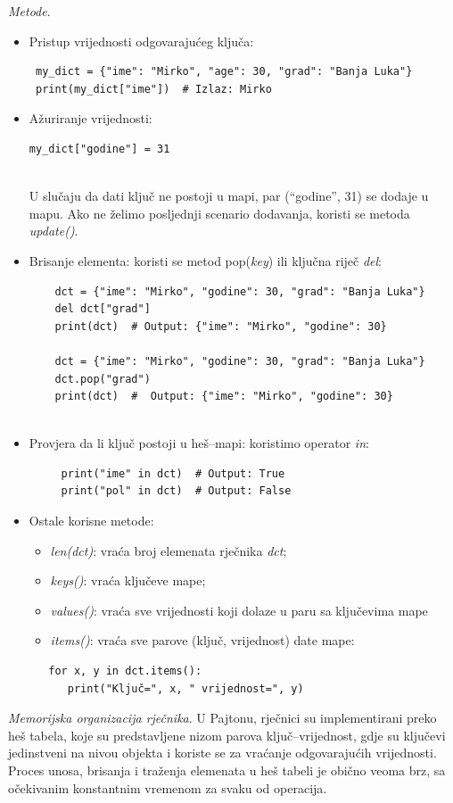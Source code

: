 \textit{Metode}. 
\begin{itemize}
	\item   Pristup vrijednosti odgovarajućeg ključa:
	
	\begin{verbatim}
 my_dict = {"ime": "Mirko", "age": 30, "grad": "Banja Luka"}
 print(my_dict["ime"])  # Izlaz: Mirko
	\end{verbatim}
	
     \item Ažuriranje vrijednosti:
     	
     \begin{verbatim}
my_dict["godine"] = 31
 
     \end{verbatim}
U slučaju da dati ključ ne postoji u mapi, par  (``godine'', 31) se dodaje u mapu.  Ako ne želimo posljednji scenario dodavanja, koristi se metoda \textit{update()}.
\item Brisanje elementa: koristi se metod pop(\textit{key}) ili ključna riječ \textit{del}:
 \begin{verbatim}
	dct = {"ime": "Mirko", "godine": 30, "grad": "Banja Luka"}
	del dct["grad"]
	print(dct)  # Output: {"ime": "Mirko", "godine": 30}
	
	dct = {"ime": "Mirko", "godine": 30, "grad": "Banja Luka"}
	dct.pop("grad")
	print(dct)  #  Output: {"ime": "Mirko", "godine": 30}
 
\end{verbatim}

\item Provjera da li ključ postoji u heš--mapi: koristimo operator \textit{in}:
 \begin{verbatim}
     print("ime" in dct)  # Output: True
     print("pol" in dct)  # Output: False
 \end{verbatim}
\item Ostale korisne metode: 
\begin{itemize}
	\item \textit{len(dct)}: vraća broj elemenata rječnika \textit{dct};
	\item \textit{keys()}: vraća ključeve mape;
	\item \textit{values()}: vraća sve vrijednosti koji dolaze u paru sa ključevima mape
	\item \textit{items()}: vraća sve parove (ključ, vrijednost) date mape:
\end{itemize}
 \begin{verbatim}
   for x, y in dct.items():
      print("Ključ=", x, " vrijednost=", y)
 \end{verbatim}
\end{itemize}
\textit{Memorijska organizacija rječnika}.  U Pajtonu, rječnici su implementirani preko heš tabela, koje su predstavljene nizom parova ključ--vrijednost, gdje su ključevi jedinstveni na nivou objekta i koriste se za vraćanje odgovarajućih vrijednosti. Proces unosa, brisanja i traženja elemenata u heš tabeli je obično veoma brz, sa očekivanim konstantnim vremenom za svaku od operacija.
	
